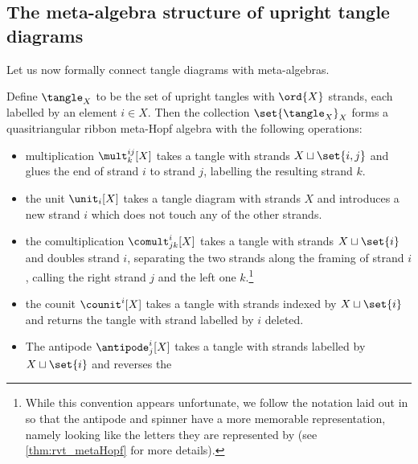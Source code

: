 \subsection{The meta-algebra structure of upright tangle diagrams}

Let us now formally connect tangle diagrams with meta-algebras.

\begin{theorem}
        \label{thm:tangles_meta_algebra}
        Define $\tangle_X$ to be the set of upright tangles with $\ord{X}$
        strands, each labelled by an element $i\in X$. Then the collection
        $\set{\tangle_X}_X$ forms a quasitriangular ribbon meta-Hopf algebra
        with the following operations:
        \begin{itemize}
                \item multiplication $\mult^{ij}_{k}[X]$ takes a tangle with
                        strands $X\sqcup\set{i,j}$ and glues the end of strand
                        $i$ to strand $j$, labelling the resulting strand $k$.
                \item the unit $\unit_{i}[X]$ takes a tangle diagram with
                        strands $X$ and introduces a new strand $i$ which does
                        not touch any of the other strands.
                \item the comultiplication $\comult^{i}_{jk}[X]$ takes a tangle
                        with strands $X\sqcup \set{i}$ and doubles strand $i$,
                        separating the two strands along the framing of strand
                        $i$, calling the right strand $j$ and the left one
                        $k$.\footnote{While this convention appears unfortunate,
                        we follow the notation laid out in \cite{BV} so that the
                        antipode and spinner have a more memorable
                        representation, namely looking like the letters they are
                        represented by (see \cref{thm:rvt_metaHopf} for more
                        details).
                }
                \item the counit $\counit^{i}[X]$ takes a tangle with strands
                        indexed by $X\sqcup \set{i}$ and returns the tangle with
                        strand labelled by $i$ deleted.
                \item The antipode $\antipode^{i}_{j}[X]$ takes a tangle with
                        strands labelled by $X \sqcup \set{i}$ and reverses the

\end{itemize}
\end{theorem}
